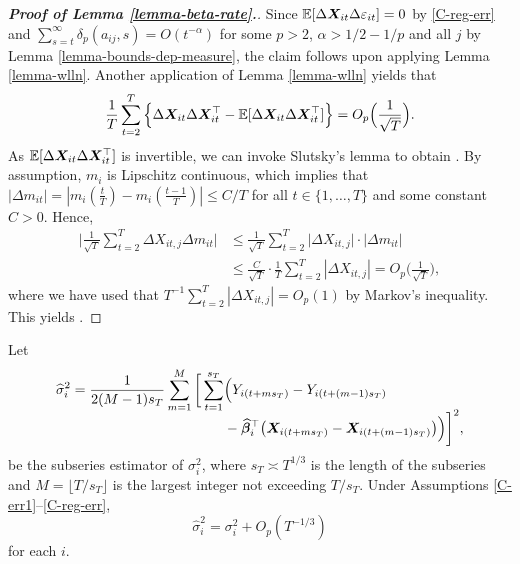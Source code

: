 \documentclass[12pt]{article}
\makeatletter
\renewcommand{\eqref}[1]{\tagform@{\ref{#1}}}
\makeatother
\begin{document}
\begin{proof}[\textnormal{\textbf{Proof of Lemma \ref{lemma-beta-rate}.}}]
Since $\mathbb{E}[\Delta \boldsymbol{X}_{it} \Delta \varepsilon_{it}] = 0$ by \ref{C-reg-err} and $\sum_{s=t}^\infty \delta_p(a_{ij}, s) = O(t^{-\alpha})$ for some $p > 2$, $\alpha > 1/2 - 1/p$ and all $j$ by Lemma \ref{lemma-bounds-dep-measure}, the claim \eqref{lemma-beta-rate-claim1} follows upon applying Lemma \ref{lemma-wlln}. Another application of Lemma \ref{lemma-wlln} yields that 
\[ \frac{1}{T}\sum_{t=2}^T \Big\{ \Delta \boldsymbol{X}_{it} \Delta \boldsymbol{X}_{it}^\top - \mathbb{E}[\Delta \boldsymbol{X}_{it} \Delta \boldsymbol{X}_{it}^\top] \Big\} = O_p\Big(\frac{1}{\sqrt{T}}\Big). \]
As $\mathbb{E}[\Delta \boldsymbol{X}_{it} \Delta \boldsymbol{X}_{it}^\top]$ is invertible, we can invoke Slutsky's lemma to obtain \eqref{lemma-beta-rate-claim2}. By assumption, $m_i$ is Lipschitz continuous, which implies that $|\Delta m_{it}| = |m_i (\frac{t}{T}) - m_i (\frac{t-1}{T}) | \leq C/T$ for all $t \in \{1, \ldots, T\}$ and some constant $C > 0$. Hence, 
\begin{align*}
\Big| \frac{1}{\sqrt{T}}\sum_{t=2}^T \Delta X_{it,j} \Delta m_{it}\Big| &\leq \frac{1}{\sqrt{T}}\sum_{t=2}^T \big|\Delta X_{it,j} \big| \cdot \big| \Delta m_{it} \big| \\
	& \leq \frac{C}{\sqrt{T}} \cdot \frac{1}{T} \sum_{t=2}^T \left|\Delta X_{it,j} \right| = O_p\Big(\frac{1}{\sqrt{T}}\Big),
\end{align*}
where we have used that $T^{-1} \sum_{t=2}^T |\Delta X_{it,j}| = O_p(1)$ by Markov's inequality. This yields \eqref{lemma-beta-rate-claim3}.
\end{proof}


{\color{red}
\begin{lemmaA}\label{lemmaA:lrv}
Let
\begin{align*}
\widehat{\sigma}_i^2 = \frac{1}{2(M-1)s_T}\sum_{m=1}^M \bigg[ \sum_{t = 1}^{s_T} & \Big(Y_{i(t + ms_T)} - Y_{i(t + (m-1)s_T)} \\[-0.2cm] & - \widehat{\bm{\beta}}_i^\top\big(\boldsymbol{X}_{i(t+ms_T)} - \boldsymbol{X}_{i(t+(m-1)s_T)}\big) \Big)\bigg]^2, 
\end{align*}
be the subseries estimator of $\sigma_i^2$, where $s_T \asymp T^{1/3}$ is the length of the subseries and $M = \lfloor T/s_T\rfloor$ is the largest integer not exceeding $T/s_T$. Under Assumptions \ref{C-err1}--\ref{C-reg-err}, 
$$\widehat{\sigma}_i^2 = \sigma_i^2 + O_p(T^{-1/3})$$
for each $i$.
\end{lemmaA}}
\end{document}
